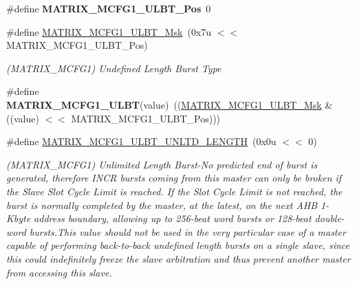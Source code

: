 \begin{DoxyCompactItemize}
\mbox{\label{group__SAMS70__MATRIX_ga436266af11999ebf0587b290c80dd563}} 
\#define {\bfseries M\+A\+T\+R\+I\+X\+\_\+\+M\+C\+F\+G1\+\_\+\+U\+L\+B\+T\+\_\+\+Pos}~0
\item 
\mbox{\label{group__SAMS70__MATRIX_gadbfc1b7cb2dc2cfca27d83f68f5a11af}} 
\#define \mbox{\hyperlink{group__SAMS70__MATRIX_gadbfc1b7cb2dc2cfca27d83f68f5a11af}{M\+A\+T\+R\+I\+X\+\_\+\+M\+C\+F\+G1\+\_\+\+U\+L\+B\+T\+\_\+\+Msk}}~(0x7u $<$$<$ M\+A\+T\+R\+I\+X\+\_\+\+M\+C\+F\+G1\+\_\+\+U\+L\+B\+T\+\_\+\+Pos)
\begin{DoxyCompactList}\small\item\em (M\+A\+T\+R\+I\+X\+\_\+\+M\+C\+F\+G1) Undefined Length Burst Type \end{DoxyCompactList}\item 
\mbox{\label{group__SAMS70__MATRIX_ga8e2a5adc448666bea542523dd6b304c2}} 
\#define {\bfseries M\+A\+T\+R\+I\+X\+\_\+\+M\+C\+F\+G1\+\_\+\+U\+L\+BT}(value)~((\mbox{\hyperlink{group__SAMS70__MATRIX_gadbfc1b7cb2dc2cfca27d83f68f5a11af}{M\+A\+T\+R\+I\+X\+\_\+\+M\+C\+F\+G1\+\_\+\+U\+L\+B\+T\+\_\+\+Msk}} \& ((value) $<$$<$ M\+A\+T\+R\+I\+X\+\_\+\+M\+C\+F\+G1\+\_\+\+U\+L\+B\+T\+\_\+\+Pos)))
\item 
\mbox{\label{group__SAMS70__MATRIX_ga6e59a9ebadc6d590b9cbeec1af27daf5}} 
\#define \mbox{\hyperlink{group__SAMS70__MATRIX_ga6e59a9ebadc6d590b9cbeec1af27daf5}{M\+A\+T\+R\+I\+X\+\_\+\+M\+C\+F\+G1\+\_\+\+U\+L\+B\+T\+\_\+\+U\+N\+L\+T\+D\+\_\+\+L\+E\+N\+G\+TH}}~(0x0u $<$$<$ 0)
\begin{DoxyCompactList}\small\item\em (M\+A\+T\+R\+I\+X\+\_\+\+M\+C\+F\+G1) Unlimited Length Burst-\/\+No predicted end of burst is generated, therefore I\+N\+CR bursts coming from this master can only be broken if the Slave Slot Cycle Limit is reached. If the Slot Cycle Limit is not reached, the burst is normally completed by the master, at the latest, on the next A\+HB 1-\/Kbyte address boundary, allowing up to 256-\/beat word bursts or 128-\/beat double-\/word bursts.\+This value should not be used in the very particular case of a master capable of performing back-\/to-\/back undefined length bursts on a single slave, since this could indefinitely freeze the slave arbitration and thus prevent another master from accessing this slave. \end{DoxyCompactList}\item 
$$
\end{DoxyCompactItemize}

